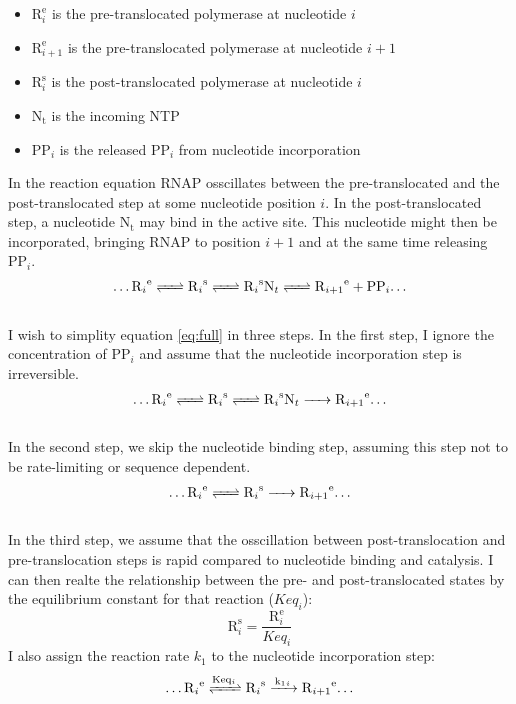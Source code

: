 \documentclass[a4paper]{article}
\newcommand{\te}[1]{\text{#1}}
\begin{document}
\begin{itemize}
	\item $\te{R}_i^{\te{e}}$ is the pre-translocated polymerase at nucleotide $i$
	\item $\te{R}_{i+1}^{\te{e}}$ is the pre-translocated polymerase at nucleotide $i+1$
	\item $\te{R}_i^{\te{s}}$ is the post-translocated polymerase at nucleotide $i$
	\item $\te{N}_{\te{t}}$ is the incoming NTP
	\item $\te{PP}_i$ is the released $\te{PP}_i$ from nucleotide incorporation
\end{itemize}
In the reaction equation RNAP osscillates between the pre-translocated and the
post-translocated step at some nucleotide position $i$. In the
post-translocated step, a nucleotide $\te{N}_{\te{t}}$ may bind in the active
site. This nucleotide might then be incorporated, bringing RNAP to position
$i+1$ and at the same time releasing $\te{PP}_i$.
\\
\begin{align}
\dots\ce{R_i^{\text{e}}
<=>
R_i^{\text{s}}
<=>
R_i^{\text{s}}N_t
<=>
R_{i+1}^{\text{e}}
+ PP_i\dots
}
\label{eq:full}
\end{align}
\\
I wish to simplity equation \ref{eq:full} in three steps. In the first step, I
ignore the concentration of $\te{PP}_i$ and assume that the nucleotide
incorporation step is irreversible.
\\
\begin{align}
\dots\ce{R_i^{\text{e}}
<=>
R_i^{\text{s}}
<=>
R_i^{\text{s}}N_t
->
R_{i+1}^{\text{e}}\dots
}
\label{eq:reduced1}
\end{align}
\\
In the second step, we skip the nucleotide binding step, assuming this
step not to be rate-limiting or sequence dependent.
\\
\begin{align}
\dots\ce{R_i^{\text{e}}
<=>
R_i^{\text{s}}
->
R_{i+1}^{\text{e}}\dots
}
\label{eq:reduced2}
\end{align}
\\
In the third step, we assume that the osscillation between post-translocation and
pre-translocation steps is rapid compared to nucleotide binding and catalysis.
I can then realte the relationship between the pre- and post-translocated
states by the equilibrium constant for that reaction ($Keq_i$):
\begin{equation}
	\te{R}_i^{\te{s}} = \frac{\te{R}_i^{\te{e}}}{Keq_i}
	\label{eq:keq}
\end{equation}
I also assign the reaction rate $k_1$ to the nucleotide incorporation step:
\\
\begin{align}
\dots\ce{R_i^{\text{e}}
<=>[\ce{Keq_i}]
R_i^{\text{s}}
->[\ce{k1_i}]
R_{i+1}^{\text{e}}\dots
}
\label{eq:reduced3}
\end{align}
\\
\end{document}
